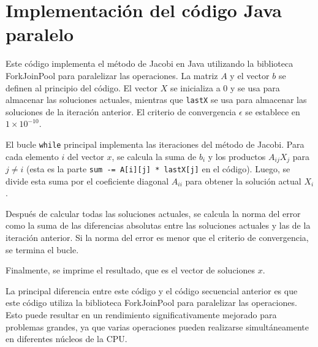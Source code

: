 \documentclass[]{article}
\begin{document}
\section{Implementación del código Java paralelo}

Este código implementa el método de Jacobi en Java utilizando la biblioteca ForkJoinPool para paralelizar las operaciones. La matriz $A$ y el vector $b$ se definen al principio del código. El vector $X$ se inicializa a $0$ y se usa para almacenar las soluciones actuales, mientras que \texttt{lastX} se usa para almacenar las soluciones de la iteración anterior. El criterio de convergencia $\epsilon$ se establece en $1 \times 10^{-10}$.

El bucle \texttt{while} principal implementa las iteraciones del método de Jacobi. Para cada elemento $i$ del vector $x$, se calcula la suma de $b_i$ y los productos $A_{ij}X_j$ para $j \neq i$ (esta es la parte \texttt{sum -= A[i][j] * lastX[j]} en el código). Luego, se divide esta suma por el coeficiente diagonal $A_{ii}$ para obtener la solución actual $X_i$.

Después de calcular todas las soluciones actuales, se calcula la norma del error como la suma de las diferencias absolutas entre las soluciones actuales y las de la iteración anterior. Si la norma del error es menor que el criterio de convergencia, se termina el bucle.

Finalmente, se imprime el resultado, que es el vector de soluciones $x$.

La principal diferencia entre este código y el código secuencial anterior es que este código utiliza la biblioteca ForkJoinPool para paralelizar las operaciones. Esto puede resultar en un rendimiento significativamente mejorado para problemas grandes, ya que varias operaciones pueden realizarse simultáneamente en diferentes núcleos de la CPU.
\end{document}
